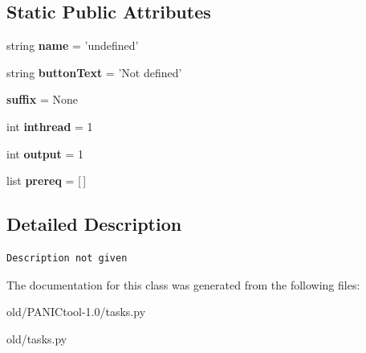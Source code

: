 \subsection*{Static Public Attributes}
\begin{CompactItemize}
\item 
string \textbf{name} = 'undefined'\label{classtasks_1_1task_9d5daece96641b7ccc3b23b081699b6d}

\item 
string \textbf{button\-Text} = 'Not defined'\label{classtasks_1_1task_47c74a10937d34df8c3557b816f8f277}

\item 
\textbf{suffix} = None\label{classtasks_1_1task_6392c45806636706521d0d44d8bf9201}

\item 
int \textbf{inthread} = 1\label{classtasks_1_1task_a36a990ce7efee7b6e78f06c5b107675}

\item 
int \textbf{output} = 1\label{classtasks_1_1task_f090c423ef95574cf59a5349659a63cc}

\item 
list \textbf{prereq} = [$\,$]\label{classtasks_1_1task_224e6683b391e12fce9ff0882e5e012b}

\end{CompactItemize}


\subsection{Detailed Description}


\footnotesize\begin{verbatim}Description not given\end{verbatim}
\normalsize
 



The documentation for this class was generated from the following files:\begin{CompactItemize}
\item 
old/PANICtool-1.0/tasks.py\item 
old/tasks.py\end{CompactItemize}
